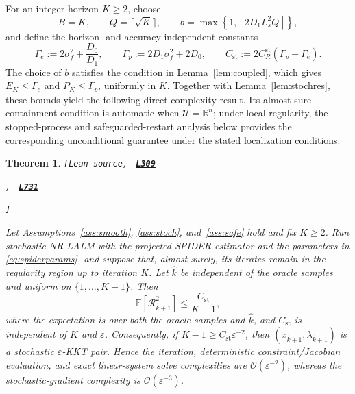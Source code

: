 \documentclass[11pt]{article}
\newtheorem{theorem}{Theorem}[section]
\theoremstyle{definition}
\theoremstyle{remark}
\numberwithin{equation}{section}
\numberwithin{figure}{section}
\numberwithin{table}{section}
\numberwithin{algorithm}{section}
\newcommand{\R}{\mathbb{R}}
\newcommand{\E}{\mathbb{E}}
\newcommand{\cO}{\mathcal{O}}
\newcommand{\eps}{\varepsilon}
\newcommand{\leanLinkText}[1]{%
  \underline{\textbf{#1}}%
}
\newcommand{\leanDeclTag}[2]{%
  {\footnotesize\texttt{[Lean source, }}%
  \href{https://github.com/optpku/ReasBook/blob/v4.32.2/ReasBook/Papers/TR_LALM_theory/#1?plain=1\#L#2}%
    {\leanLinkText{\footnotesize\texttt{L#2}}}%
}
\newcommand{\leanDeclTagExtra}[2]{%
  \unskip
  {\footnotesize\texttt{, }}%
  \href{https://github.com/optpku/ReasBook/blob/v4.32.2/ReasBook/Papers/TR_LALM_theory/#1?plain=1\#L#2}%
    {\leanLinkText{\footnotesize\texttt{L#2}}}\allowbreak
}
\newcommand{\leanDeclTagEnd}{%
  \unskip
  {\footnotesize\texttt{]}}\enspace
}
\begin{document}
For an integer horizon $K\ge2$, choose
\begin{equation}
    B=K,
    \qquad Q=\lceil\sqrt K\rceil,
    \qquad
    b=\max\left\{1,
       \left\lceil 2D_1L_s^2Q\right\rceil\right\},
    \label{eq:spiderparams}
\end{equation}
and define the horizon- and accuracy-independent constants
$$
\Gamma_e:=2\sigma_f^2+\frac{D_0}{D_1},
\qquad
\Gamma_p:=2D_1\sigma_f^2+2D_0,
\qquad
C_{\mathrm{st}}
:=2C_R^{\mathrm{st}}(\Gamma_p+\Gamma_e).
$$
The choice of $b$ satisfies the condition in Lemma~\ref{lem:coupled}, which gives $E_K\le\Gamma_e$ and $P_K\le\Gamma_p$, uniformly in $K$.  Together with Lemma~\ref{lem:stochres}, these bounds yield the following direct
complexity result.  Its almost-sure containment condition is automatic when $\mathcal U=\R^n$; under local regularity, the stopped-process and safeguarded-restart analysis below provides the corresponding unconditional guarantee under the stated localization conditions.

\begin{theorem}
\label{thm:stochastic}
\leanDeclTag{Theorem_3_6.lean}{309}
\leanDeclTagExtra{Theorem_3_6.lean}{731}
\leanDeclTagEnd
Let Assumptions~\ref{ass:smooth}, \ref{ass:stoch}, and~\ref{ass:safe} hold
and fix \(K\ge2\).  Run
stochastic NR-LALM with the projected SPIDER estimator and the parameters in
\eqref{eq:spiderparams}, and suppose that, almost surely, its iterates remain in the regularity region up to iteration $K$. Let \(\widehat{k}\) be independent of the oracle
samples and uniform on \(\{1,\ldots,K-1\}\).  Then
\begin{equation}
    \E[\mathcal{R}_{\widehat{k}+1}^2]
    \le \frac{C_{\mathrm{st}}}{K-1},
    \label{eq:stochrate}
\end{equation}
where the expectation is over both the oracle samples and \(\widehat{k}\), and
\(C_{\mathrm{st}}\) is independent of \(K\) and \(\eps\).  Consequently, if
\(K-1\ge C_{\mathrm{st}}\eps^{-2}\), then
\((x_{\widehat{k}+1},\lambda_{\widehat{k}+1})\) is a stochastic
\(\eps\)-KKT pair.  Hence the iteration, deterministic constraint/Jacobian
evaluation, and exact linear-system solve complexities are
\(\cO(\eps^{-2})\), whereas the stochastic-gradient complexity is
\(\cO(\eps^{-3})\).
\end{theorem}
\end{document}
